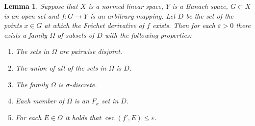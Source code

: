 \documentclass[12pt,a4paper]{amsart}
\theoremstyle{plain}
\newtheorem{lemma}[theorem]{Lemma}         %
\theoremstyle{definition}
\theoremstyle{remark}
\numberwithin{equation}{section}
\newcommand{\osc}{\operatorname{osc}}
\begin{document}
\begin{lemma}\label{partition}	
Suppose that  $X$ is a normed linear space,  $Y$ is  a Banach  space, $G\subset X$ is an 
open set and $f:G \to Y$ is an arbitrary  mapping. Let  $D$ be the set  of the points $x\in G$ at which the Fr\'echet derivative of $f$ exists.
	Then for each $\varepsilon>0$ there exists a family $\Omega$ of subsets of $D$ with the following
	 properties:
\begin{enumerate}
\item[(a)]	The sets in $\Omega$  are pairwise disjoint.
\item[(b)] The union of all of the sets in $\Omega$  is $D$.
\item[(c)]	The family $\Omega$   is $\sigma$-discrete.
\item[(d)]	Each member of	$\Omega$  is an $F_{\sigma}$ set  in $D$. 
\item[(e)]	For each $ E \in \Omega$  it holds that $\osc(f',E) \leq \varepsilon$.
\end{enumerate}
\end{lemma}
\end{document}
